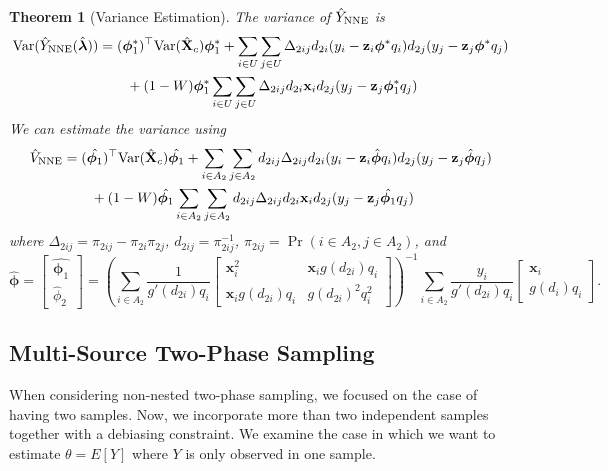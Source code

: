 \documentclass[12pt]{article}
\newtheorem{theorem}{Theorem}
\newcommand{\Var}{{\text{Var}}}
\renewcommand{\bf}[1]{\mathbf{#1}}
\begin{document}
\begin{theorem}[Variance Estimation]\label{thm:nnve}
  The variance of $\hat Y_{\rm NNE}$ is 
  \begin{align*}
    \Var(\hat Y_{\rm NNE}(\hat{\bm \lambda}))
    &= (\bm \phi_1^*)^\top \Var(\hat{\bf X}_c) \bm \phi_1^* + 
    \sum_{i \in U} \sum_{j \in U} \Delta_{2ij}d_{2i}
    (y_i - \bf z_i \bm \phi^* q_i)d_{2j}(y_j - \bf z_j \bm \phi^* q_j)\\
    &\qquad + (1 - W)\bm \phi_1^* \sum_{i \in U} \sum_{j \in U} \Delta_{2ij}
    d_{2i} \bf x_i d_{2j}(y_j - \bf z_j \bm \phi^*_1 q_j)\\
  \end{align*}
  We can estimate the variance using
  \begin{align*}
    \hat V_{\rm NNE} 
    &= (\hat{\bm \phi_1})^\top \Var(\hat{\bf X}_c) \hat{\bm \phi_1} + 
    \sum_{i \in A_2} \sum_{j \in A_2} d_{2ij} \Delta_{2ij} d_{2i}
    (y_i - \bf z_i \hat{\bm \phi} q_i) d_{2j} (y_j - \bf z_j \hat{\bm \phi} q_j) \\
    &\qquad + (1 - W)\hat{\bm \phi_1} \sum_{i \in A_2} \sum_{j \in A_2} d_{2ij} \Delta_{2ij}
    d_{2i}\bf x_i d_{2j}(y_j - \bf z_j \hat{\bm \phi_1} q_j)
  \end{align*}
  where $\Delta_{2ij} = \pi_{2ij} - \pi_{2i}\pi_{2j}$, $d_{2ij} = \pi_{2ij}^{-1}$, 
  $\pi_{2ij} = \Pr(i \in A_2, j \in A_2)$, and 
  $$\hat{\bm \phi} =
  \begin{bmatrix}
    \hat{\bm \phi_1} \\ \hat \phi_2
  \end{bmatrix} = 
  \left(\sum_{i \in A_2} \frac{1}{g'(d_{2i})q_i} 
  \begin{bmatrix}
    \bf x_i^2 & \bf x_i g(d_{2i}) q_i \\
    \bf x_i g(d_{2i}) q_i & g(d_{2i})^2 q_i^2
  \end{bmatrix}
  \right)^{-1}
  \sum_{i \in A_2} \frac{y_i}{g'(d_{2i}) q_i} 
  \begin{bmatrix} \bf x_i \\ g(d_i) q_i \end{bmatrix}.
  $$
\end{theorem}

\subsection{Multi-Source Two-Phase Sampling}

When considering non-nested two-phase sampling, we focused on the case of having
two samples. Now, we incorporate more than two independent samples
together with a debiasing constraint. We examine the case in which we
want to estimate $\theta = E[Y]$ where $Y$ is only observed in one sample.
\end{document}
